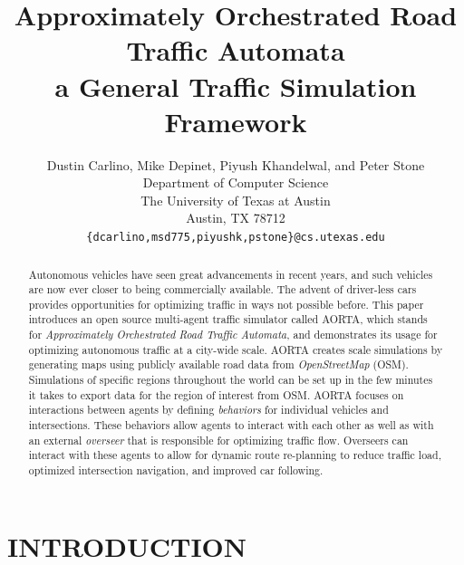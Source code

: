 \documentclass[letterpaper, 10 pt, conference]{ieeeconf}  %
\title{\LARGE \bf
Approximately Orchestrated Road Traffic Automata\\
a General Traffic Simulation Framework
}
\author{Dustin Carlino, Mike Depinet, Piyush Khandelwal, and Peter Stone\\
        Department of Computer Science\\
        The University of Texas at Austin\\
        Austin, TX 78712\\
        {\tt \small\{dcarlino,msd775,piyushk,pstone\}@cs.utexas.edu}}
\begin{document}
\maketitle
\thispagestyle{empty}
\pagestyle{empty}



\begin{abstract} 
Autonomous vehicles have seen great advancements in recent years, and
such vehicles are now ever closer to being commercially available.
The advent of driver-less cars provides opportunities for optimizing
traffic in ways not possible before. This paper introduces an open
source multi-agent traffic simulator called AORTA, which stands for
\textit{Approximately Orchestrated Road Traffic Automata}, and
demonstrates its usage for optimizing autonomous traffic at a
city-wide scale. AORTA creates scale simulations by generating maps
using publicly available road data from \textit{OpenStreetMap}
(OSM). Simulations of specific regions throughout the world can be set
up in the few minutes it takes to export data for the region of
interest from OSM. AORTA focuses on interactions between agents by
defining \textit{behaviors} for individual vehicles and
intersections. These behaviors allow agents to interact with each
other as well as with an external \textit{overseer} that is
responsible for optimizing traffic flow. Overseers can interact with
these agents to allow for dynamic route re-planning to reduce traffic
load, optimized intersection navigation, and improved car following.
\end{abstract}


\section{INTRODUCTION}
\label{sec:introduction}

\end{document}
